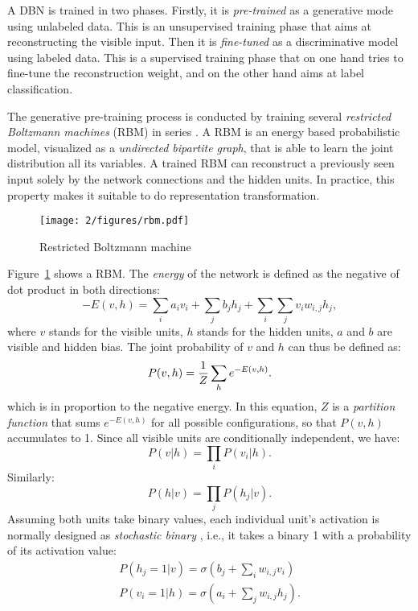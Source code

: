 A DBN is trained in two phases. Firstly, it is {\it pre-trained} as a generative mode using unlabeled data. This is an unsupervised training phase that aims at reconstructing the visible input. Then it is {\it fine-tuned} as a discriminative model using labeled data. This is a supervised training phase that on one hand tries to fine-tune the reconstruction weight, and on the other hand aims at label classification.


The generative pre-training process is conducted by training several {\it restricted Boltzmann machines} (RBM) in series \cite{hinton2006fast}. A RBM \cite{smolensky1986information} is an energy based probabilistic model, visualized as a {\it undirected bipartite graph}, that is able to learn the joint distribution all its variables. A trained RBM can reconstruct a previously seen input solely by the network connections and the hidden units. In practice, this property makes it suitable to do representation transformation.
\begin{figure}[htb]
\centering
\texttt{[image: 2/figures/rbm.pdf]}
\caption{Restricted Boltzmann machine}
\label{fig:2-rbm}
\end{figure}

Figure~\ref{fig:2-rbm} shows a RBM. The {\it energy} of the network is defined as the negative of dot product in both directions:
\begin{equation}
-E(v,h) = \sum_i a_iv_i + \sum_j b_jh_j + \sum_i\sum_j v_iw_{i,j}h_j,
\end{equation}
where $v$ stands for the visible units, $h$ stands for the hidden units, $a$ and $b$ are visible and hidden bias. The joint probability of $v$ and $h$ can thus be defined as:
\begin{equation}
P(v,h) = {1\over Z} \sum_h e^{-E(v,h)}.
\end{equation}
which is in proportion to the negative energy. In this equation, $Z$ is a {\it partition function} that sums $e^{-E(v,h)}$ for all possible configurations, so that $P(v,h)$ accumulates to 1. Since all visible units are conditionally independent, we have:
\begin{equation}
P(v|h) = \prod_i P(v_i|h).
\end{equation}
Similarly:
\begin{equation}
P(h|v) = \prod_j P(h_j|v).
\end{equation}
Assuming both units take binary values, each individual unit's activation is normally designed as {\it stochastic binary} \cite{hinton2010practical}, i.e., it takes a binary 1 with a probability of its activation value:
\begin{equation}
\begin{split}
P(h_j=1|v) = \sigma(b_j+\sum_i w_{i,j}v_i) \\
P(v_i=1|h) = \sigma(a_i+\sum_j w_{i,j}h_j).
\end{split}
\end{equation}

